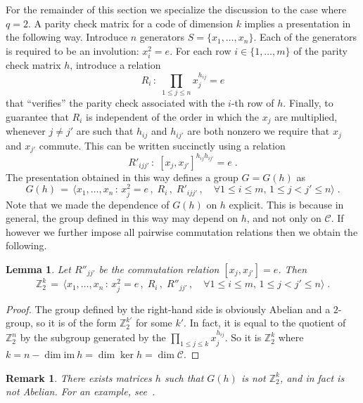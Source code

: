 \documentclass[11pt]{article}
\newtheorem{lemma}[theorem]{Lemma}
\newtheorem{remark}[theorem]{Remark}
\theoremstyle{definition}
\newcommand{\code}{\mathscr{C}}
\newcommand{\Z}{\ensuremath{\mathbb{Z}}}
\begin{document}
For the remainder of this section we specialize the discussion to the case where $q=2$. 
A parity check matrix for a code of dimension $k$ implies a presentation in the following way. Introduce $n$ generators $S=\{x_1,\ldots,x_n\}$. Each of the generators is required to be an involution: $x_i^2=e$. For each row $i\in \{1,\ldots,m\}$ of the parity check matrix $h$, introduce a relation 
\[ R_i\,:\; \prod_{1\leq j \leq n} x_j^{h_{ij}}=e \]
that ``verifies'' the parity check associated with the $i$-th row of $h$. Finally, to guarantee that $R_i$ is independent of the order in which the $x_j$ are multiplied, whenever $j\neq j'$ are such that $h_{ij}$ and $h_{ij'}$ are both nonzero we require that $x_j$ and $x_{j'}$ commute. This can be written succinctly using a relation 
\[ R'_{ijj'}\,:\; [x_j,x_{j'}]^{h_{ij} h_{ij'}}=e\;.\]
The presentation obtained in this way defines a group $G=G(h)$ as 
\begin{equation}\label{eq:def-gh-pres}
 G(h) \,=\, \big\langle x_1,\ldots,x_n \,:\, x_j^2=e\,,\; R_i\,,\; R'_{ijj'}\,,\quad \forall 1\leq i\leq m,\, 1\leq j< j' \leq n\big\rangle\;.
\end{equation}
Note that we made the dependence of $G(h)$ on $h$ explicit. This is because in general, the group defined in this way may depend on $h$, and not only on $\code$. If however we further impose all pairwise commutation relations then we obtain the following. 

\begin{lemma}\label{lem:com-code}
Let $R''_{jj'}$ be the commutation relation $[x_j,x_{j'}]=e$. Then
\[ \Z_2^k \,=\, \big\langle x_1,\ldots,x_n \,:\, x_j^2=e\,,\; R_i\,,\; R''_{jj'}\,,\quad \forall 1\leq i\leq m,\, 1\leq j< j' \leq n\big\rangle\;.\]
\end{lemma}

\begin{proof}
The group defined by the right-hand side is obviously Abelian and a $2$-group, so it is of the form $\Z_2^{k'}$ for some $k'$. In fact, it is equal to the quotient of $\Z_2^n$ by the subgroup generated by the $\prod_{1\leq j \leq k} x_j^{h_{ij}}$. So it is $\Z_2^k$ where $k=n-\dim\textrm{im}\ h = \dim\ker h=\dim \code$.  
\end{proof}

\begin{remark}\label{rk:non-abelian}
There exists matrices $h$ such that $G(h)$ is not $\Z_2^k$, and in fact is not Abelian. For an example, see~\cite[Example 2.16]{paddock2022arkhipov}.  
\end{remark}
\end{document}
